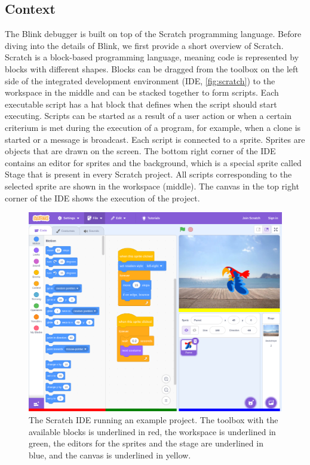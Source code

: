 \documentclass[../main]{subfiles}
\begin{document}
\subsection{Context}\label{subsec:blink-context}
The Blink debugger is built on top of the Scratch programming language.
Before diving into the details of Blink, we first provide a short overview of Scratch.
Scratch is a block-based programming language, meaning code is represented by blocks with different shapes.
Blocks can be dragged from the toolbox on the left side of the integrated development environment (IDE, \vref{fig:scratch}) to the workspace in the middle and can be stacked together to form scripts.
Each executable script has a hat block that defines when the script should start executing.
Scripts can be started as a result of a user action or when a certain criterium is met during the execution of a program, for example, when a clone is started or a message is broadcast.
Each script is connected to a sprite.
Sprites are objects that are drawn on the screen.
The bottom right corner of the IDE contains an editor for sprites and the background, which is a special sprite called Stage that is present in every Scratch project.
All scripts corresponding to the selected sprite are shown in the workspace (middle).
The canvas in the top right corner of the IDE shows the execution of the project.

\begin{figure}
    \centering
    \begin{wide}
        \includegraphics[width=\linewidth]{scratch-normal-ide}
    \end{wide}
    \caption{The Scratch IDE running an example project.
    The toolbox with the available blocks is underlined in red, the workspace is underlined in green, the editors for the sprites and the stage are underlined in blue, and the canvas is underlined in yellow.}
    \label{fig:scratch}
\end{figure}
\end{document}
